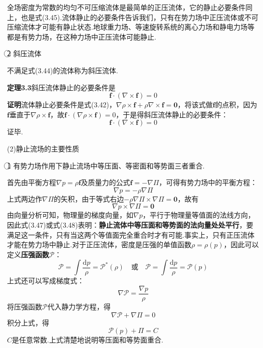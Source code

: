 全场密度为常数的均匀不可压缩流体是最简单的正压流体，它的静止必要条件同上，也是式(3.45).流体静止的必要条件告诉我们，只有在势力场中正压流体或不可压缩流体才可能有静止状态.地球重力场、等速旋转系统的离心力场和静电力场等都是有势力场，在这种力场中正压流体可能静止.

\textcircled{2} 斜压流体

不满足式(3.44)的流体称为斜压流体.

\noindent\textbf{定理3.3}\quad 斜压流体静止的必要条件是
\begin{equation*}
\boldsymbol{f}\cdot(\nabla\times\boldsymbol{f})=0
\tag{3.46}
\end{equation*}
\noindent\textbf{证明}\quad 流体静止必要条件是式(3.42)，$\nabla\rho\times\boldsymbol{f}+\rho\nabla\times\boldsymbol{f}=\boldsymbol{0}$，将该式做$\boldsymbol{f}$的点积，因为$\boldsymbol{f}$垂直于$\nabla\rho\times\boldsymbol{f}$，故$\boldsymbol{f}\cdot(\nabla\rho\times\boldsymbol{f})=0$，于是得斜压流体静止的必要条件：
\[
\boldsymbol{f}\cdot(\nabla\times\boldsymbol{f})=0
\]
证毕.

(2)静止流场的主要性质

\textcircled{1} 有势力场作用下静止流场中等压面、等密面和等势面三者重合.

首先由平衡方程$\nabla p=\rho\boldsymbol{f}$及质量力的公式$\boldsymbol{f}=-\nabla\Pi$，可得有势力场中的平衡方程：
\begin{equation*}
\nabla p=-\rho\nabla\Pi
\tag{3.47}
\end{equation*}
上式两边作$\nabla\Pi$的矢积，由于等式右边$-\rho\nabla\Pi\times\nabla\Pi=\boldsymbol{0}$，故有
\begin{equation*}
\nabla p\times\nabla\Pi=\boldsymbol{0}
\tag{3.48}
\end{equation*}
由向量分析可知，物理量的梯度向量，如$\nabla p$，平行于物理量等值面的法线方向，因此式(3.47)或式(3.48)表明：\textbf{静止流体中等压面和等势面的法向量处处平行}，要满足这一条件，只有当这两个等值面完全重合时才有可能.事实上，只有正压流体才能在势力场中静止.对于正压流体，密度是压强的单值函数$\rho=\rho(p)$，因此可以定义\textbf{压强函数}$\mathscr{P}$：
\begin{equation*}
\mathscr{P}=\int\frac{\mathrm{d}p}{\rho}=\mathscr{P}^{*}(\rho)\quad\text{或}\quad \mathscr{P}=\int\frac{\mathrm{d}p}{\rho}=\mathscr{P}(p)
\tag{3.49}
\end{equation*}
上式还可以写成梯度式：
\[
\nabla\mathscr{P}=\frac{\nabla p}{\rho}
\]
将压强函数$\mathscr{P}$代入静力学方程，得
\[
\nabla\mathscr{P}+\nabla\Pi=0
\]
积分上式，得
\begin{equation*}
\mathscr{P}(p)+\Pi=C
\tag{3.50}
\end{equation*}
$C$是任意常数.上式清楚地说明等压面和等势面重合.

